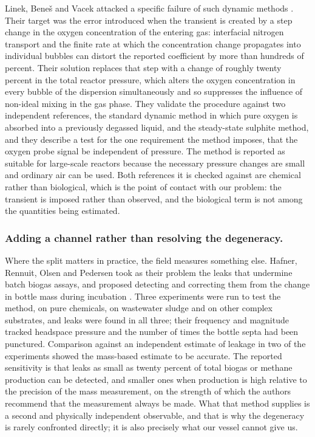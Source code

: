 \documentclass[sigconf]{acmart}
\begin{document}
Linek, Bene\v{s} and Vacek attacked a specific failure of such dynamic
methods \cite{linek1989dynamic}. Their target was the error introduced
when the transient is created by a step change in the oxygen
concentration of the entering gas: interfacial nitrogen transport and
the finite rate at which the concentration change propagates into
individual bubbles can distort the reported coefficient by more than
hundreds of percent. Their solution replaces that step with a change of
roughly twenty percent in the total reactor pressure, which alters the
oxygen concentration in every bubble of the dispersion simultaneously
and so suppresses the influence of non-ideal mixing in the gas phase.
They validate the procedure against two independent references, the
standard dynamic method in which pure oxygen is absorbed into a
previously degassed liquid, and the steady-state sulphite method, and
they describe a test for the one requirement the method imposes, that
the oxygen probe signal be independent of pressure. The method is
reported as suitable for large-scale reactors because the necessary
pressure changes are small and ordinary air can be used. Both
references it is checked against are chemical rather than biological,
which is the point of contact with our problem: the transient is
imposed rather than observed, and the biological term is not among the
quantities being estimated.

\subsubsection{Adding a channel rather than resolving the degeneracy.}
Where the split matters in practice, the field measures something else.
Hafner, Rennuit, Olsen and Pedersen took as their problem the leaks
that undermine batch biogas assays, and proposed detecting and
correcting them from the change in bottle mass during
incubation \cite{hafner2018quantification}. Three experiments were run
to test the method, on pure chemicals, on wastewater sludge and on
other complex substrates, and leaks were found in all three; their
frequency and magnitude tracked headspace pressure and the number of
times the bottle septa had been punctured. Comparison against an
independent estimate of leakage in two of the experiments showed the
mass-based estimate to be accurate. The reported sensitivity is that
leaks as small as twenty percent of total biogas or methane production
can be detected, and smaller ones when production is high relative to
the precision of the mass measurement, on the strength of which the
authors recommend that the measurement always be made. What that
method supplies is a second and physically independent observable, and
that is why the degeneracy is rarely confronted directly; it is also
precisely what our vessel cannot give us.
\end{document}
